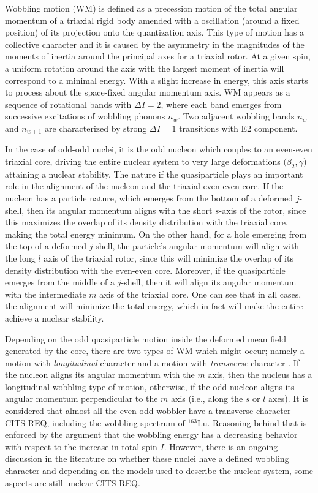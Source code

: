 \documentclass[%
 reprint,
 amsmath,
 amssymb,
 aps,
 floatfix,
]{revtex4-2}
\begin{document}
Wobbling motion (WM) is defined as a precession motion of the total angular momentum of a triaxial rigid body amended with a oscillation (around a fixed position) of its projection onto the quantization axis. This type of motion has a collective character and it is caused by the asymmetry in the magnitudes of the moments of inertia around the principal axes for a triaxial rotor. At a given spin, a uniform rotation around the axis with the largest moment of inertia will correspond to a minimal energy. With a slight increase in energy, this axis starts to process about the space-fixed angular momentum axis. WM appears as a sequence of rotational bands with $\Delta I=2$, where each band emerges from successive excitations of wobbling phonons $n_w$. Two adjacent wobbling bands $n_w$ and $n_{w+1}$ are characterized by strong $\Delta I=1$ transitions with E2 component.

In the case of odd-odd nuclei, it is the odd nucleon which couples to an even-even triaxial core, driving the entire nuclear system to very large deformations $(\beta_2,\gamma$) attaining a nuclear stability. The nature if the quasiparticle plays an important role in the alignment of the nucleon and the triaxial even-even core. If the nucleon has a particle nature, which emerges from the bottom of a deformed $j$-shell, then its angular momentum aligns with the short $s$-axis of the rotor, since this maximizes the overlap of its density distribution with the triaxial core, making the total energy minimum. On the other hand, for a hole emerging from the top of a deformed $j$-shell, the particle's angular momentum will align with the long $l$ axis of the triaxial rotor, since this will minimize the overlap of its density distribution with the even-even core. Moreover, if the quasiparticle emerges from the middle of a $j$-shell, then it will align its angular momentum with the intermediate $m$ axis of the triaxial core. One can see that in all cases, the alignment will minimize the total energy, which in fact will make the entire achieve a nuclear stability.

Depending on the odd quasiparticle motion inside the deformed mean field generated by the core, there are two types of WM which might occur; namely a motion with \emph{longitudinal} character and a motion with \emph{transverse} character \cite{frauendorf2014transverse}. If the nucleon aligns its angular momentum with the $m$ axis, then the nucleus has a longitudinal wobbling type of motion, otherwise, if the odd nucleon aligns its angular momentum perpendicular to the $m$ axis (i.e., along the $s$ or $l$ axes). It is considered that almost all the even-odd wobbler have a transverse character {\color{red}CITS REQ}, including the wobbling spectrum of $^{163}$Lu. Reasoning behind that is enforced by the argument that the wobbling energy has a decreasing behavior with respect to the increase in total spin $I$. However, there is an ongoing discussion in the literature on whether these nuclei have a defined wobbling character and depending on the models used to describe the nuclear system, some aspects are still unclear {\color{red}CITS REQ}.
\end{document}
